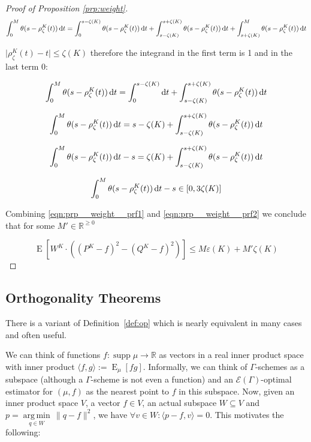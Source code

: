 \documentclass{article}
\numberwithin{equation}{section}
\theoremstyle{definition}
\theoremstyle{plain}
\DeclareMathOperator{\Supp}{supp}
\DeclareMathOperator{\E}{E}
\newcommand{\Argmin}[1]{\underset{#1}{\operatorname{arg\,min}}\,}
\newcommand{\Reals}{\mathbb{R}}
\newcommand{\Abs}[1]{\lvert #1 \rvert}
\newcommand{\Norm}[1]{\lVert #1 \rVert}
\newcommand{\Chev}[1]{\langle #1 \rangle}
\newcommand{\Fall}{\mathcal{E}}
\newcommand{\EG}{\Fall(\Gamma)}
\begin{document}
\begin{proof}[Proof of Proposition \ref{prp:weight}]
$$\int_0^M \theta(s-\rho_\zeta^{K}(t)) \dif t = \int_0^{s-\zeta(K)} \theta(s-\rho_\zeta^{K}(t)) \dif t + \int_{s-\zeta(K)}^{s+\zeta(K)} \theta(s-\rho_\zeta^{K}(t)) \dif t + \int_{s+\zeta(K)}^M \theta(s-\rho_\zeta^{K}(t)) \dif t$$

$\Abs{\rho_\zeta^{K}(t)-t} \leq \zeta(K)$ therefore the integrand in the first term is 1 and in the last term 0:

$$\int_0^M \theta(s-\rho_\zeta^{K}(t)) \dif t = \int_0^{s-\zeta(K)} \dif t + \int_{s-\zeta(K)}^{s+\zeta(K)} \theta(s-\rho_\zeta^{K}(t)) \dif t$$

$$\int_0^M \theta(s-\rho_\zeta^{K}(t)) \dif t = s-\zeta(K) + \int_{s-\zeta(K)}^{s+\zeta(K)} \theta(s-\rho_\zeta^{K}(t)) \dif t$$

$$\int_0^M \theta(s-\rho_\zeta^{K}(t)) \dif t - s = \zeta(K) + \int_{s-\zeta(K)}^{s+\zeta(K)} \theta(s-\rho_\zeta^{K}(t)) \dif t$$

\begin{equation}
\label{eqn:prp__weight__prf2}
\int_0^M \theta(s-\rho_\zeta^{K}(t)) \dif t - s \in [0,3\zeta(K)]
\end{equation}

Combining \ref{eqn:prp__weight__prf1} and \ref{eqn:prp__weight__prf2} we conclude that for some $M' \in \Reals^{\geq 0}$

$$\E[W^{K} \cdot ((P^{K}-f)^2-(Q^{K}-f)^2)] \leq M \varepsilon(K) + M'\zeta(K)$$
\end{proof}

\subsection{Orthogonality Theorems}

There is a variant of Definition~\ref{def:op} which is nearly equivalent in many cases and often useful.

We can think of functions $f: \Supp \mu \rightarrow \Reals$ as vectors in a real inner product space with inner product $\Chev{f,g}:=\E_\mu[fg]$. Informally, we can think of $\Gamma$-schemes as a subspace (although a $\Gamma$-scheme is not even a function) and an $\EG$-optimal estimator for $(\mu,f)$ as the nearest point to $f$ in this subspace. Now, given an inner product space $V$, a vector $f \in V$, an actual subspace $W \subseteq V$ and $p = \Argmin{q \in W} \Norm{q - f}^2$, we have $\forall v \in W: \Chev{p-f,v}=0$. This motivates the following:
\end{document}
